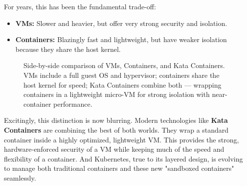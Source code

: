 For years, this has been the fundamental trade-off:
\begin{itemize}
\item \textbf{VMs:} Slower and heavier, but offer very strong security and isolation.
\item \textbf{Containers:} Blazingly fast and lightweight, but have weaker isolation because they share the host kernel.
\end{itemize}
\begin{figure}[htbp]
\centering

\caption{Side-by-side comparison of VMs, Containers, and Kata Containers. VMs include a full guest OS and hypervisor; containers share the host kernel for speed; Kata Containers combine both --- wrapping containers in a lightweight micro-VM for strong isolation with near-container performance.}
\label{fig:1_4}
\end{figure}



Excitingly, this distinction is now blurring. Modern technologies like \textbf{Kata Containers} are combining the best of both worlds. They wrap a standard container inside a highly optimized, lightweight VM. This provides the strong, hardware-enforced security of a VM while keeping much of the speed and flexibility of a container. And Kubernetes, true to its layered design, is evolving to manage both traditional containers and these new "sandboxed containers" seamlessly.
